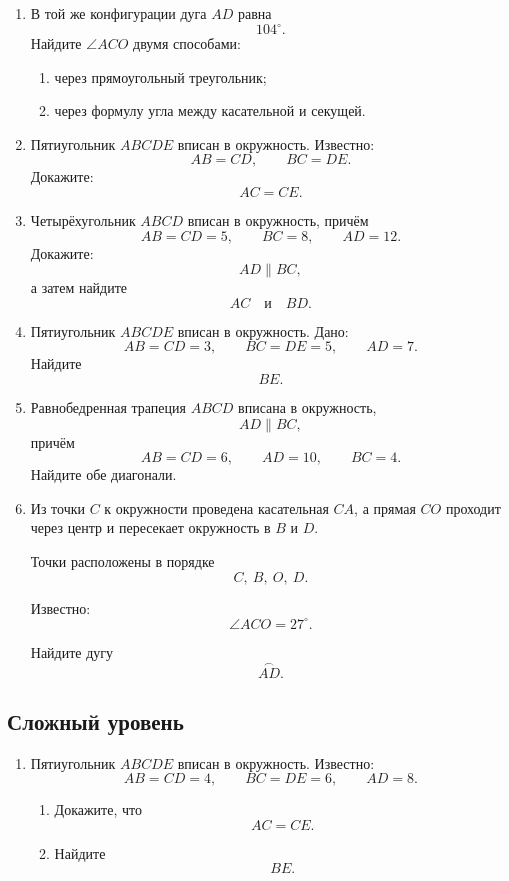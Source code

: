 \documentclass[a4paper,12pt]{article}
\begin{document}
\begin{enumerate}[label=\textbf{\arabic*.},resume]

  \item
  В той же конфигурации
  дуга \(AD\) равна
  \[
  104^\circ.
  \]
  Найдите \(\angle ACO\) двумя способами:

  \begin{enumerate}[label=\arabic*)]
    \item через прямоугольный треугольник;
    \item через формулу угла между касательной и секущей.
  \end{enumerate}

  \item
  Пятиугольник \(ABCDE\)
  вписан в окружность.
  Известно:
  \[
  AB=CD,
  \qquad
  BC=DE.
  \]
  Докажите:
  \[
  AC=CE.
  \]

  \item
  Четырёхугольник \(ABCD\)
  вписан в окружность, причём
  \[
  AB=CD=5,
  \qquad
  BC=8,
  \qquad
  AD=12.
  \]
  Докажите:
  \[
  AD\parallel BC,
  \]
  а затем найдите
  \[
  AC
  \quad\text{и}\quad
  BD.
  \]

  \item
  Пятиугольник \(ABCDE\)
  вписан в окружность.
  Дано:
  \[
  AB=CD=3,
  \qquad
  BC=DE=5,
  \qquad
  AD=7.
  \]
  Найдите
  \[
  BE.
  \]

  \item
  Равнобедренная трапеция \(ABCD\)
  вписана в окружность,
  \[
  AD\parallel BC,
  \]
  причём
  \[
  AB=CD=6,
  \qquad
  AD=10,
  \qquad
  BC=4.
  \]
  Найдите обе диагонали.

  \item
  Из точки \(C\)
  к окружности проведена касательная \(CA\),
  а прямая \(CO\) проходит через центр
  и пересекает окружность в \(B\) и \(D\).

  Точки расположены в порядке
  \[
  C,\ B,\ O,\ D.
  \]

  Известно:
  \[
  \angle ACO=27^\circ.
  \]

  Найдите дугу
  \[
  \overset{\frown}{AD}.
  \]

\end{enumerate}

\subsection*{Сложный уровень}

\begin{enumerate}[label=\textbf{\arabic*.},resume]

  \item
  Пятиугольник \(ABCDE\)
  вписан в окружность.
  Известно:
  \[
  AB=CD=4,
  \qquad
  BC=DE=6,
  \qquad
  AD=8.
  \]

  \begin{enumerate}[label=\arabic*)]
    \item Докажите, что
    \[
    AC=CE.
    \]

    \item Найдите
    \[
    BE.
    \]
  \end{enumerate}

\end{enumerate}
\end{document}
